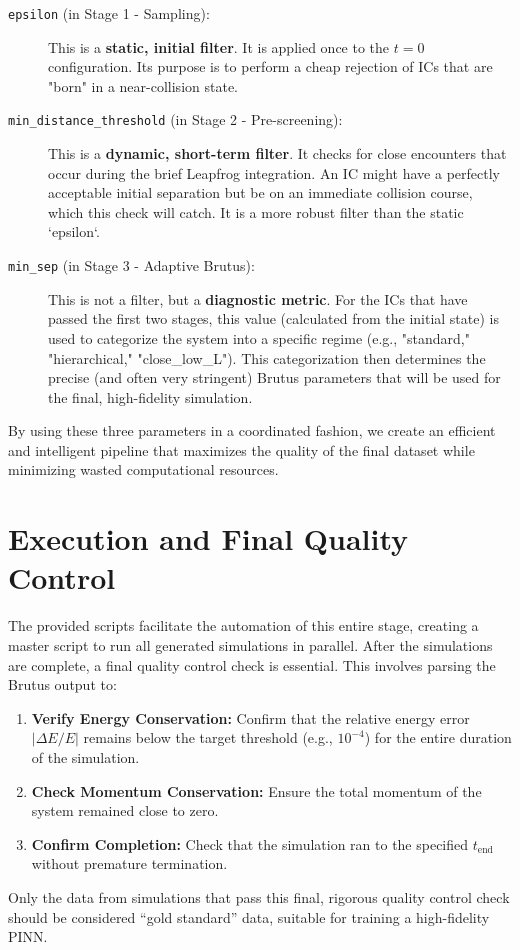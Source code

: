 \documentclass{article}
\begin{document}
\begin{description}
    \item[\texttt{epsilon} (in Stage 1 - Sampling):] This is a \textbf{static, initial filter}. It is applied once to the $t=0$ configuration. Its purpose is to perform a cheap rejection of ICs that are "born" in a near-collision state.
    
    \item[\texttt{min\_distance\_threshold} (in Stage 2 - Pre-screening):] This is a \textbf{dynamic, short-term filter}. It checks for close encounters that occur during the brief Leapfrog integration. An IC might have a perfectly acceptable initial separation but be on an immediate collision course, which this check will catch. It is a more robust filter than the static `epsilon`.
    
    \item[\texttt{min\_sep} (in Stage 3 - Adaptive Brutus):] This is not a filter, but a \textbf{diagnostic metric}. For the ICs that have passed the first two stages, this value (calculated from the initial state) is used to categorize the system into a specific regime (e.g., "standard," "hierarchical," "close\_low\_L"). This categorization then determines the precise (and often very stringent) Brutus parameters that will be used for the final, high-fidelity simulation.
\end{description}

By using these three parameters in a coordinated fashion, we create an efficient and intelligent pipeline that maximizes the quality of the final dataset while minimizing wasted computational resources.



\section{Execution and Final Quality Control}
The provided scripts facilitate the automation of this entire stage, creating a master script to run all generated simulations in parallel. After the simulations are complete, a final quality control check is essential. This involves parsing the Brutus output to:
\begin{enumerate}
    \item \textbf{Verify Energy Conservation:} Confirm that the relative energy error $|\Delta E/E|$ remains below the target threshold (e.g., $10^{-4}$) for the entire duration of the simulation.
    \item \textbf{Check Momentum Conservation:} Ensure the total momentum of the system remained close to zero.
    \item \textbf{Confirm Completion:} Check that the simulation ran to the specified $t_{\mathrm{end}}$ without premature termination.
\end{enumerate}

Only the data from simulations that pass this final, rigorous quality control check should be considered ``gold standard'' data, suitable for training a high-fidelity PINN.
\end{document}
